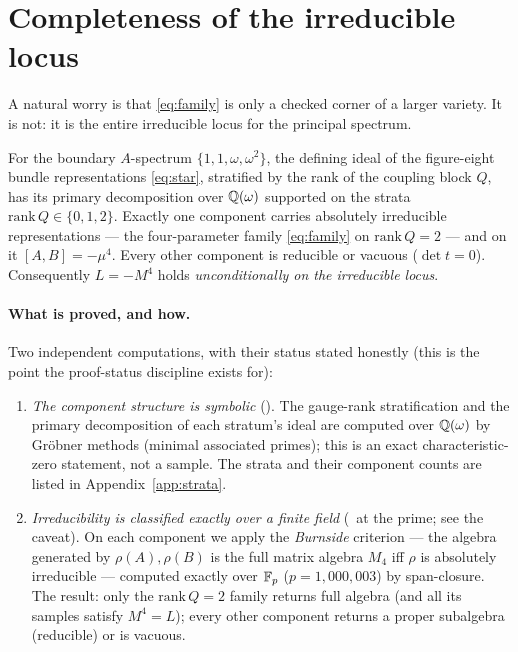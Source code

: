 \section{Completeness of the irreducible locus}
\label{sec:complete2}

A natural worry is that \eqref{eq:family} is only a checked corner of a larger variety. It is not: it is
the entire irreducible locus for the principal spectrum.

\begin{theorem}\label{thm:complete}
For the boundary $A$-spectrum $\{1,1,\omega,\omega^2\}$, the defining ideal of the figure-eight bundle
representations \eqref{eq:star}, stratified by the rank of the coupling block $Q$, has its primary
decomposition over $\mathbb{Q}(\omega)$ supported on the strata $\mathrm{rank}\,Q\in\{0,1,2\}$. Exactly one
component carries absolutely irreducible representations --- the four-parameter family
\eqref{eq:family} on $\mathrm{rank}\,Q=2$ --- and on it $[A,B]=-\mu^4$. Every other component is reducible
or vacuous ($\det t=0$). Consequently $L=-M^4$ holds \emph{unconditionally on the irreducible locus}.
\end{theorem}

\paragraph{\textmd{\textbf{What is proved, and how.}}} Two independent computations, with their status
stated honestly (this is the point the proof-status discipline exists for):
\begin{enumerate}[leftmargin=1.6em]
\item \emph{The component structure is symbolic} (\sExact). The gauge-rank stratification and the primary
  decomposition of each stratum's ideal are computed over $\mathbb{Q}(\omega)$ by Gr\"obner methods
  (minimal associated primes); this is an exact characteristic-zero statement, not a sample. The strata
  and their component counts are listed in Appendix~\ref{app:strata}.
\item \emph{Irreducibility is classified exactly over a finite field} (\sProved\ at the prime; see the
  caveat). On each component we apply the \emph{Burnside} criterion --- the algebra generated by
  $\rho(A),\rho(B)$ is the full matrix algebra $M_4$ iff $\rho$ is absolutely irreducible --- computed
  exactly over $\mathbb{F}_p$ ($p=1{,}000{,}003$) by span-closure. The result: only the $\mathrm{rank}\,Q=2$
  family returns full algebra (and all its samples satisfy $M^4=L$); every other component returns a
  proper subalgebra (reducible) or is vacuous.
\end{enumerate}

